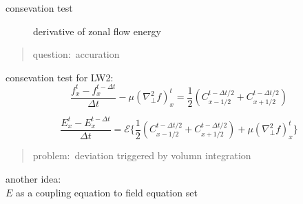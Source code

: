 \documentclass{beamer}
\begin{document}
\begin{frame}{consevation test}

\begin{figure}[H]
	\centering
	\caption{derivative of zonal flow energy }
\end{figure}

	\begin{quotation}
		{\color{magenta} question:\ accuration}
	\end{quotation}

\end{frame}


\begin{frame}{consevation test}
	for LW2: 
	\begin{equation}
		\frac{f_x^t-f_x^{t-\Delta{t}}}{\Delta{t}}-\mu(\nabla_\perp^2{f})_x^{t}
		= \frac{1}{2}( C_{x-1/2}^{t-\Delta{t}/2}+C_{x+1/2}^{t-\Delta{t}/2} )
	\end{equation}
	
	\begin{equation}
		\frac{E_x^t-E_x^{t-\Delta{t}}}{\Delta{t}}
		= \mathcal{E}\{ \frac{1}{2}( C_{x-1/2}^{t-\Delta{t}/2}+C_{x+1/2}^{t-\Delta{t}/2} ) +\mu(\nabla_\perp^2{f})_x^{t} \}
	\end{equation}
	
	\begin{quotation}
		{\color{blue} problem:\ deviation triggered by volumn integration}
	\end{quotation}
	another idea:	\\
	\qquad $E$ as a coupling equation to field equation set
\end{frame}
\end{document}
